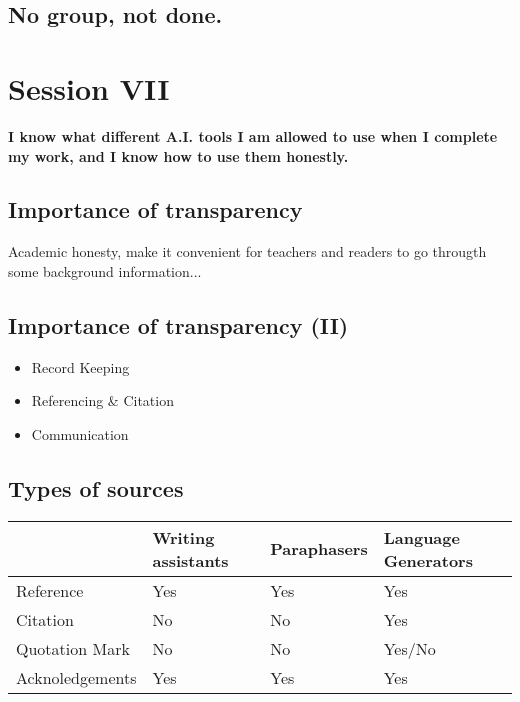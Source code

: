 \documentclass[a4paper]{article}
\begin{document}
\subsection{No group, not done.}

\section{Session VII}

\textbf{I know what different A.I. tools I am allowed to use when I complete my work, and I know how to use them honestly.}

\subsection{Importance of transparency}

Academic honesty, make it convenient for teachers and readers to go througth some background information...

\subsection{Importance of transparency (II)}

\begin{itemize}
    \item Record Keeping
    \item Referencing \& Citation
    \item Communication
\end{itemize}

\subsection{Types of sources}

\begin{table}[ht!]
    \begin{tabular}{|l|l|l|l|}
    \hline
                    & Writing assistants & Paraphasers & Language Generators \\ \hline
    Reference       & Yes                & Yes         & Yes                 \\ \hline
    Citation        & No                 & No          & Yes                 \\ \hline
    Quotation Mark  & No                 & No          & Yes/No              \\ \hline
    Acknoledgements & Yes                & Yes         & Yes                 \\ \hline
    \end{tabular}
    \end{table}
\end{document}
